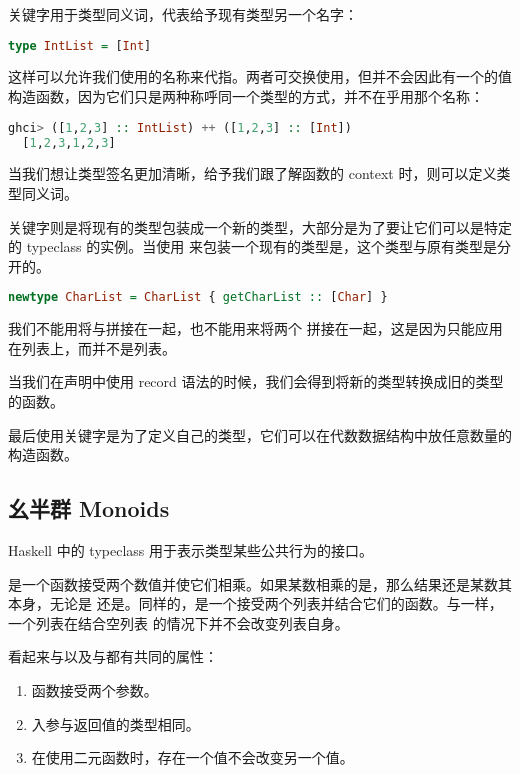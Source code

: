 \documentclass[./main.tex]{subfiles}
\begin{document}
关键字用于类型同义词，代表给予现有类型另一个名字：

\begin{lstlisting}[language=Haskell]
  type IntList = [Int]
\end{lstlisting}

这样可以允许我们使用的名称来代指\acode{[Int]}。两者可交换使用，但并不会因此有一个的值
构造函数，因为它们只是两种称呼同一个类型的方式，并不在乎用那个名称：

\begin{lstlisting}[language=Haskell]
  ghci> ([1,2,3] :: IntList) ++ ([1,2,3] :: [Int])
  [1,2,3,1,2,3]
\end{lstlisting}

当我们想让类型签名更加清晰，给予我们跟了解函数的 context 时，则可以定义类型同义词。

关键字则是将现有的类型包装成一个新的类型，大部分是为了要让它们可以是特定的 typeclass 的实例。当使用
来包装一个现有的类型是，这个类型与原有类型是分开的。

\begin{lstlisting}[language=Haskell]
  newtype CharList = CharList { getCharList :: [Char] }
\end{lstlisting}

我们不能用\acode{++}将与\acode{[Char]}拼接在一起，也不能用\acode{++}来将两个
拼接在一起，这是因为\acode{++}只能应用在列表上，而并不是列表。

当我们在声明中使用 record 语法的时候，我们会得到将新的类型转换成旧的类型的函数。

最后使用关键字是为了定义自己的类型，它们可以在代数数据结构中放任意数量的构造函数。

\subsection*{幺半群 Monoids}

Haskell 中的 typeclass 用于表示类型某些公共行为的接口。

\acode{*}是一个函数接受两个数值并使它们相乘。如果某数相乘的是，那么结果还是某数其本身，无论是
还是。同样的，\acode{++}是一个接受两个列表并结合它们的函数。与\acode{*}一样，一个列表在结合空列表
\acode{[]}的情况下并不会改变列表自身。

看起来\acode{*}与以及\acode{++}与\acode{[]}都有共同的属性：

\begin{enumerate}
  \item 函数接受两个参数。
  \item 入参与返回值的类型相同。
  \item 在使用二元函数时，存在一个值不会改变另一个值。
\end{enumerate}
\end{document}
